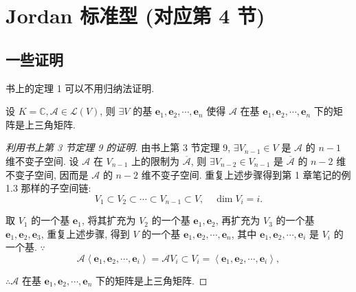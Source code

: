 \documentclass[color=black,device=normal,lang=cn,mode=geye]{elegantnote}
\begin{document}
\section{Jordan 标准型 (对应第 4 节)}
\subsection{一些证明}
书上的定理 1 可以不用归纳法证明.
\begin{theorem}
    设 $K=\mathbb{C},\mathcal{A}\in\mathcal{L}(V)$, 则 $\exists V$ 的基 $\boldsymbol{e}_1,\boldsymbol{e}_2,\cdots,\boldsymbol{e}_n$ 使得 $\mathcal{A}$ 在基 $\boldsymbol{e}_1,\boldsymbol{e}_2,\cdots,\boldsymbol{e}_n$ 下的矩阵是上三角矩阵.
\end{theorem}
\begin{proof}[利用书上第 3 节定理 9 的证明]
    由书上第 3 节定理 9, $\exists V_{n-1}\in V$ 是 $\mathcal{A}$ 的 $n-1$ 维不变子空间. 设 $\mathcal{A}$ 在 $V_{n-1}$ 上的限制为 $\overline{\mathcal{A}}$, 则 $\exists V_{n-2}\in V_{n-1}$ 是 $\overline{\mathcal{A}}$ 的 $n-2$ 维不变子空间, 因而是 $\mathcal{A}$ 的 $n-2$ 维不变子空间. 重复上述步骤得到第 1 章笔记的例 1.3 那样的子空间链:
    \[V_1\subset V_2\subset\cdots\subset V_{n-1}\subset V,\quad\dim V_i=i.\]

    取 $V_1$ 的一个基 $\boldsymbol{e}_1$, 将其扩充为 $V_2$ 的一个基 $\boldsymbol{e}_1,\boldsymbol{e}_2$, 再扩充为 $V_3$ 的一个基 $\boldsymbol{e}_1,\boldsymbol{e}_2,\boldsymbol{e}_3$, 重复上述步骤, 得到 $V$ 的一个基 $\boldsymbol{e}_1,\boldsymbol{e}_2,\cdots,\boldsymbol{e}_n$, 其中 $\boldsymbol{e}_1,\boldsymbol{e}_2,\cdots,\boldsymbol{e}_i$ 是 $V_i$ 的一个基. $\because$
    \[\mathcal{A}\left<\boldsymbol{e}_1,\boldsymbol{e}_2,\cdots,\boldsymbol{e}_i\right>=\mathcal{A}V_i\subset V_i=\left<\boldsymbol{e}_1,\boldsymbol{e}_2,\cdots,\boldsymbol{e}_i\right>,\]

    $\therefore\mathcal{A}$ 在基 $\boldsymbol{e}_1,\boldsymbol{e}_2,\cdots,\boldsymbol{e}_n$ 下的矩阵是上三角矩阵.
\end{proof}
\end{document}
